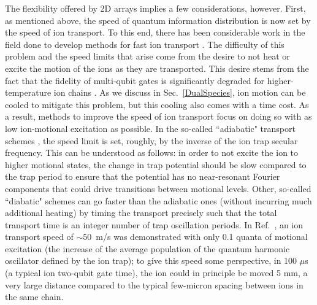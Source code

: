 \documentclass[%
12pt,
 amsmath,amssymb,
]{revtex4-2}
\begin{document}
The flexibility offered by 2D arrays implies a few considerations, however.  First, as mentioned above, the speed of quantum information distribution is now set by the speed of ion transport.  To this end, there has been considerable work in the field done to develop methods for fast ion transport \cite{BowlerDiabaticTransportSplit2012,WaltherDiabaticTransport2012,LuFastShuttling2018}.  The difficulty of this problem and the speed limits that arise come from the desire to not heat or excite the motion of the ions as they are transported.  This desire stems from the fact that the fidelity of multi-qubit gates is significantly degraded for higher-temperature ion chains \cite{KirchmairHotGates2009}.  As we discuss in Sec.~\ref{DualSpecies}, ion motion can be cooled to mitigate this problem, but this cooling also comes with a time cost.  As a result, methods to improve the speed of ion transport focus on doing so with as low ion-motional excitation as possible.  In the so-called ``adiabatic" transport schemes \cite{FurstTransportAnalysis2014}, the speed limit is set, roughly, by the inverse of the ion trap secular frequency.  This can be understood as follows: in order to not excite the ion to higher motional states, the change in trap potential should be slow compared to the trap period to ensure that the potential has no near-resonant Fourier components that could drive transitions between motional levels.  Other, so-called ``diabatic" schemes \cite{BowlerDiabaticTransportSplit2012,WaltherDiabaticTransport2012,LuFastShuttling2018} can go faster than the adiabatic ones (without incurring much additional heating) by timing the transport precisely such that the total transport time is an integer number of trap oscillation periods.  In Ref.~\cite{BowlerDiabaticTransportSplit2012}, an ion transport speed of ${\sim}50$~m/s was demonstrated with only 0.1 quanta of motional excitation (the increase of the average population of the quantum harmonic oscillator defined by the ion trap); to give this speed some perspective, in 100 $\mu$s (a typical ion two-qubit gate time), the ion could in principle be moved 5 mm, a very large distance compared to the typical few-micron spacing between ions in the same chain.
\end{document}
